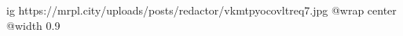  
 
 
 
 

\ifcmt
  ig https://mrpl.city/uploads/posts/redactor/vkmtpyocovltreq7.jpg
  @wrap center
  @width 0.9
\fi
